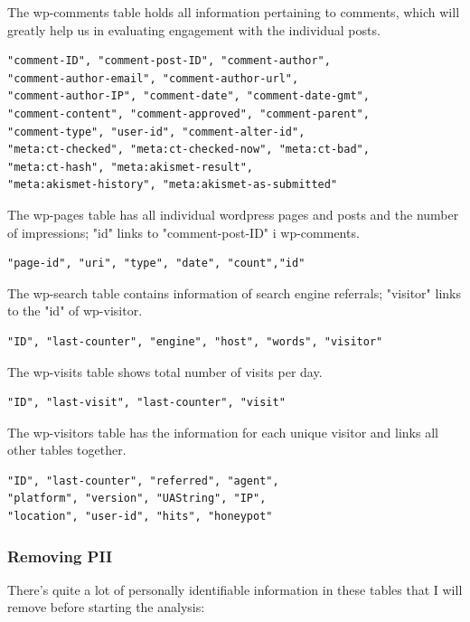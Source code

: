 The wp-comments table holds all information pertaining to comments, which will greatly help us in evaluating engagement with the individual posts.
\begin{lstlisting}[caption=wp-comments, frame=single, basicstyle=\ttfamily]
"comment-ID", "comment-post-ID", "comment-author", 
"comment-author-email", "comment-author-url", 
"comment-author-IP", "comment-date", "comment-date-gmt", 
"comment-content", "comment-approved", "comment-parent", 
"comment-type", "user-id", "comment-alter-id", 
"meta:ct-checked", "meta:ct-checked-now", "meta:ct-bad", 
"meta:ct-hash", "meta:akismet-result", 
"meta:akismet-history", "meta:akismet-as-submitted"
\end{lstlisting}

The wp-pages table has all individual wordpress pages and posts and the number of impressions; "id" links to "comment-post-ID" i wp-comments.
\begin{lstlisting}[caption=wp-pages, frame=single, basicstyle=\ttfamily]
"page-id", "uri", "type", "date", "count","id"
\end{lstlisting}

The wp-search table contains information of search engine referrals; "visitor" links to the "id" of wp-visitor.
\begin{lstlisting}[caption=wp-search, frame=single, basicstyle=\ttfamily]
"ID", "last-counter", "engine", "host", "words", "visitor"
\end{lstlisting}

The wp-visits table shows total number of visits per day.
\begin{lstlisting}[caption=wp-visit, frame=single, basicstyle=\ttfamily]
"ID", "last-visit", "last-counter", "visit"
\end{lstlisting}

The wp-visitors table has the information for each unique visitor and links all other tables together.
\begin{lstlisting}[caption=wp-visitor, frame=single, basicstyle=\ttfamily]
"ID", "last-counter", "referred", "agent", 
"platform", "version", "UAString", "IP", 
"location", "user-id", "hits", "honeypot"
\end{lstlisting}

\subsubsection{Removing PII}

There's quite a lot of personally identifiable information in these tables that I will remove before starting the analysis:

